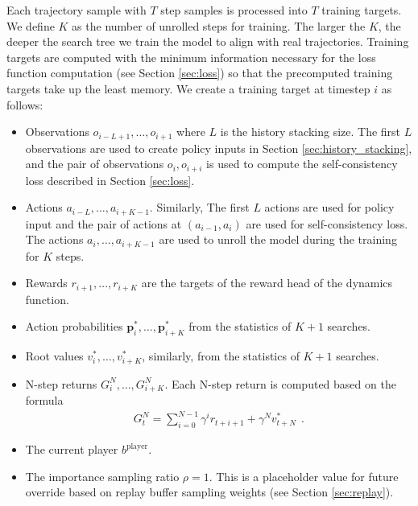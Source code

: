 Each trajectory sample with $T$ step samples is processed into $T$ training targets.
We define $K$ as the number of unrolled steps for training.
The larger the $K$, the deeper the search tree we train the model to align with real trajectories.
Training targets are computed with the minimum information necessary for the loss function computation (see Section \ref{sec:loss}) so that the precomputed training targets take up the least memory.
We create a training target at timestep $i$ as follows:
\begin{itemize}
    \item Observations $o_{i - L + 1}, \dots, o_{i + 1}$ where $L$ is the history stacking size.
          The first $L$ observations are used to create policy inputs in Section \ref{sec:history_stacking},
          and the pair of observations $o_{i}, o_{i+i}$ is used to compute the self-consistency loss described in Section \ref{sec:loss}.

    \item Actions $a_{i - L}, \dots, a_{i + K - 1}$.
          Similarly, The first $L$ actions are used for policy input and the pair of actions at $(a_{i - 1}, a_{i})$ are used for self-consistency loss.
          The actions $a_{i}, \dots, a_{i + K - 1}$ are used to unroll the model during the training for $K$ steps.

    \item Rewards $r_{i + 1}, \dots, r_{i + K}$ are the targets of the reward head of the dynamics function.

    \item Action probabilities $\mathbf{p}^*_{i}, \dots, \mathbf{p}^*_{i + K}$ from the statistics of $K + 1$ searches.

    \item Root values $v^*_i, \dots, v^*_{i + K}$, similarly, from the statistics of $K + 1$ searches.

    \item N-step returns $G^N_{i}, \dots, G^N_{i + K}$.
          Each N-step return is computed based on the formula
          \begin{align*}
              G^N_{t} = \sum_{i = 0}^{N - 1}{\gamma^i r_{t+i+1}} + \gamma^Nv^*_{t + N} ~~ .
          \end{align*}

    \item The current player $b^{\text{player}}$.

    \item The importance sampling ratio $\rho = 1$. This is a placeholder value for future override based on replay buffer sampling weights (see Section \ref{sec:replay}).
\end{itemize}


